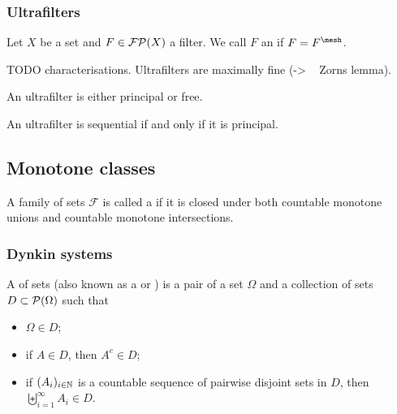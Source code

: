 \subsubsection{Ultrafilters}
\begin{definition}
Let $X$ be a set and $F\in\operatorname{\mathcal{FP}}(X)$ a filter. We call $F$ an  if $F = F^{\mesh}$.
\end{definition}

TODO characterisations. Ultrafilters are maximally fine (-> ~ Zorns lemma).

\begin{proposition}
An ultrafilter is either principal or free.
\end{proposition}

\begin{proposition}
An ultrafilter is sequential \textup{if and only if} it is principal.
\end{proposition}

\subsection{Monotone classes}
\begin{definition}
A family of sets $\mathcal{F}$ is called a  if it is closed under both countable monotone unions and countable monotone intersections.
\end{definition}

\subsubsection{Dynkin systems}
\begin{definition}
A  of sets (also known as a  or ) is a pair of a set $\Omega$ and a collection of sets $D\subset\operatorname{\mathcal{P}}(\Omega)$ such that
\begin{itemize}
\item $\Omega\in D$;
\item if $A\in D$, then $A^c\in D$;
\item if $(A_i)_{i\in\mathbb{N}}$ is a countable sequence of pairwise disjoint sets in $D$, then $\biguplus_{i=1}^\infty A_i\in D$.
\end{itemize}
\end{definition}

